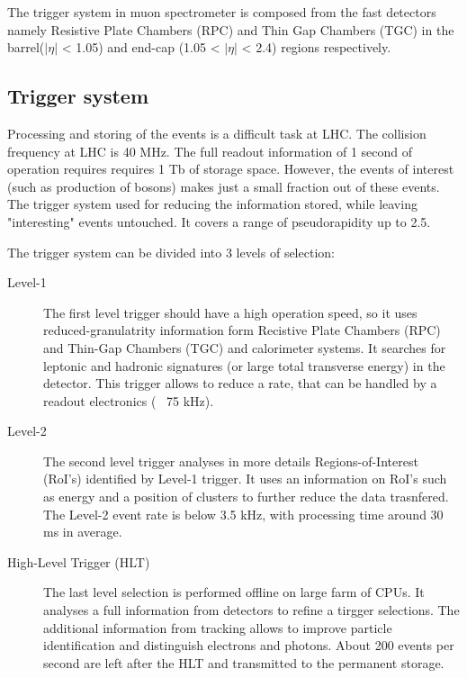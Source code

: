 The trigger system in muon spectrometer is composed from the fast detectors namely Resistive Plate Chambers (RPC) and Thin Gap Chambers (TGC) in the barrel($|\eta|$ < 1.05) and end-cap (1.05 < $|\eta|$ < 2.4) regions respectively. 

\begin{figure}[!tb]
\end{figure}

\subsection{Trigger system}
Processing and storing of the events is a difficult task at LHC. The collision frequency at LHC is 40 MHz. The full readout information of 1 second of operation requires requires 1 Tb of storage space. However, the events of interest (such as production of bosons) makes just a small fraction out of these events. The trigger system used for reducing the information stored, while leaving "interesting" events untouched. It covers a range of pseudorapidity up to 2.5.

The trigger system can be divided into 3 levels of selection:
\begin{description}
\item[Level-1] The first level trigger should have a high operation speed, so it uses reduced-granulatrity information form Recistive Plate Chambers (RPC) and Thin-Gap Chambers (TGC) and calorimeter systems. It searches for leptonic and hadronic signatures (or large total transverse energy) in the detector. This trigger allows to reduce a rate, that can be handled by a readout electronics (~ 75 kHz).
\item[Level-2] The second level trigger analyses in more details Regions-of-Interest (RoI's) identified by Level-1 trigger. It uses an information on RoI's such as energy and a position of clusters to further reduce the data trasnfered. The Level-2 event rate is below 3.5 kHz, with processing time around 30 ms in average.
\item[High-Level Trigger (HLT)] The last level selection is performed offline on large farm of CPUs. It analyses a full information from detectors to refine a tirgger selections. The additional information from tracking allows to improve particle identification and distinguish electrons and photons. About 200 events per second are left after the HLT and transmitted to the permanent storage.
\end{description}

